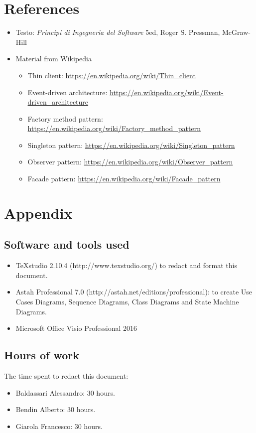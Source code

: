 \documentclass[a4paper,11pt]{report} %
\begin{document}
	\section{References}
	\begin{itemize}
		\item Testo: \textit{Principi di Ingegneria del Software} 5ed, Roger S. Pressman, McGraw-Hill
		\item Material from Wikipedia
		\begin{itemize}
			\item Thin client: \href{https://en.wikipedia.org/wiki/Thin_client}{https://en.wikipedia.org/wiki/Thin\_client}
			\item Event-driven architecture: \href{https://en.wikipedia.org/wiki/Event-driven_architecture}{https://en.wikipedia.org/wiki/Event-driven\_architecture}
			\item Factory method pattern: \href{https://en.wikipedia.org/wiki/Factory_method_pattern}{https://en.wikipedia.org/wiki/Factory\_method\_pattern}
			\item Singleton pattern: \href{https://en.wikipedia.org/wiki/Singleton_pattern}{https://en.wikipedia.org/wiki/Singleton\_pattern}
			\item Observer pattern: \href{https://en.wikipedia.org/wiki/Observer_pattern}{https://en.wikipedia.org/wiki/Observer\_pattern}
			\item Facade pattern: \href{https://en.wikipedia.org/wiki/Facade_pattern}{https://en.wikipedia.org/wiki/Facade\_pattern}
			
		\end{itemize}
	\end{itemize}
	
	
	\section{Appendix}
	
	\subsection{Software and tools used}
	\begin{itemize}
		\item TeXstudio 2.10.4 (http://www.texstudio.org/) to redact and format this document.
		\item Astah Professional 7.0 (http://astah.net/editions/professional): to create Use
		Cases Diagrams, Sequence Diagrams, Class Diagrams and State Machine	Diagrams.
		\item Microsoft Office Visio Professional 2016
	\end{itemize}
	
	\subsection{Hours of work} The time spent to redact this document:
	\begin{itemize}
		\item Baldassari Alessandro: 30 hours.
		\item Bendin Alberto: 30 hours.
		\item Giarola Francesco: 30 hours.
	\end{itemize}
\end{document}
